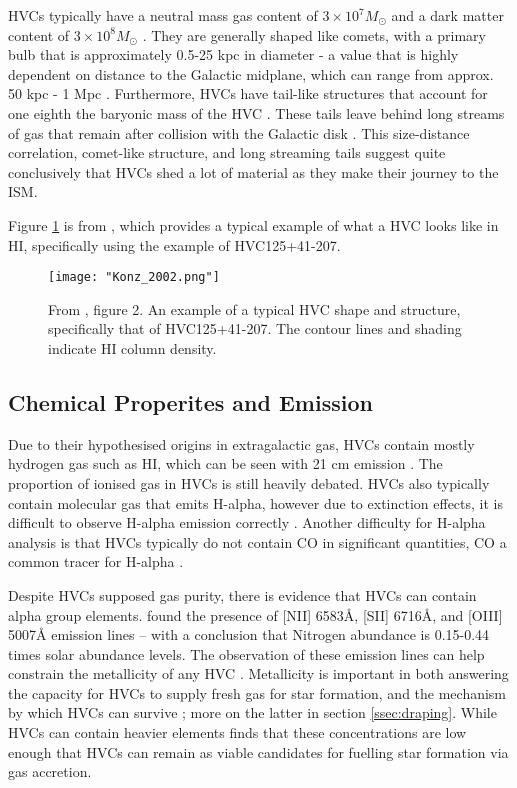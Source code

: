 HVCs typically have a neutral mass gas content of $3\times10^7 M_{\odot}$ and a dark matter content of $3\times10^8 M_{\odot}$ \citep{ID66}. They are generally shaped like comets, with a primary bulb that is approximately 0.5-25 kpc in diameter - a value that is highly dependent on distance to the Galactic midplane, which can range from approx. 50 kpc - 1 Mpc \citep{ID66, ID13}. Furthermore, HVCs have tail-like structures that account for one eighth the baryonic mass of the HVC \citep{ID13}. These tails leave behind long streams of gas that remain after collision with the Galactic disk \citep{ID19}. This size-distance correlation, comet-like structure, and long streaming tails suggest quite conclusively that HVCs shed a lot of material as they make their journey to the ISM.


Figure \ref{fig:hvc_example} is from \cite{ID13}, which provides a typical example of what a HVC looks like in HI, specifically using the example of HVC125+41-207.

\begin{figure}
    \texttt{[image: "Konz\_2002.png"]}
    \centering
    \caption{From \cite{ID13}, figure 2. An example of a typical HVC shape and structure, specifically that of HVC125+41-207. The contour lines and shading indicate HI column density.}
    \label{fig:hvc_example}
\end{figure}

\subsection{Chemical Properites and Emission}
\label{ssec:chem}

Due to their hypothesised origins in extragalactic gas, HVCs contain mostly hydrogen gas such as HI, which can be seen with 21 cm emission \citep{ID7, ID8, ID6}. The proportion of ionised gas in HVCs is still heavily debated. HVCs also typically contain molecular gas that emits H-alpha, however due to extinction effects, it is difficult to observe H-alpha emission correctly \citep{ID9, ID43}. Another difficulty for H-alpha analysis is that HVCs typically do not contain CO in significant quantities, CO a common tracer for H-alpha \citep{ID66}.


Despite HVCs supposed gas purity, there is evidence that HVCs can contain alpha group elements. \cite{ID49, ID48} found the presence of [NII] 6583{\AA}, [SII] 6716{\AA}, and [OIII] 5007{\AA} emission lines – with a conclusion that Nitrogen abundance is 0.15-0.44 times solar abundance levels. The observation of these emission lines can help constrain the metallicity of any HVC  \citep{ID49}. Metallicity is important in both answering the capacity for HVCs to supply fresh gas for star formation, and the mechanism by which HVCs can survive \citep{ID24}; more on the latter in section \ref{ssec:draping}. While HVCs can contain heavier elements \cite{ID46} finds that these concentrations are low enough that HVCs can remain as viable candidates for fuelling star formation via gas accretion.



